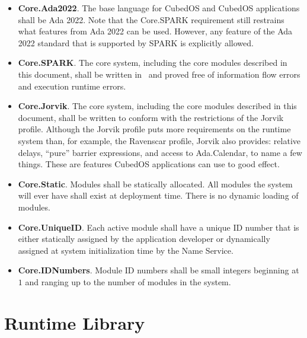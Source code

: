 \begin{itemize}
\item \textbf{Core.Ada2022}. The base language for CubedOS and CubedOS applications shall be Ada
2022. Note that the Core.SPARK requirement still restrains what features from Ada 2022 can be
used. However, any feature of the Ada 2022 standard that is supported by SPARK is explicitly
allowed.

\item \textbf{Core.SPARK}. The core system, including the core modules described in this
document, shall be written in \SPARK\ and proved free of information flow errors and execution
runtime errors.

\item \textbf{Core.Jorvik}. The core system, including the core modules described in this
document, shall be written to conform with the restrictions of the Jorvik profile. Although the
Jorvik profile puts more requirements on the runtime system than, for example, the Ravenscar
profile, Jorvik also provides: relative delays, ``pure'' barrier expressions, and access to
Ada.Calendar, to name a few things. These are features CubedOS applications can use to good
effect.

\item \textbf{Core.Static}. Modules shall be statically allocated. All modules the system will
ever have shall exist at deployment time. There is no dynamic loading of modules. 

\item \textbf{Core.UniqueID}. Each active module shall have a unique ID number that is either
statically assigned by the application developer or dynamically assigned at system
initialization time by the Name Service. 

\item \textbf{Core.IDNumbers}. Module ID numbers shall be small integers beginning at $1$ and
ranging up to the number of modules in the system.
\end{itemize}

\section{Runtime Library}
\label{sec:runtime-library}

